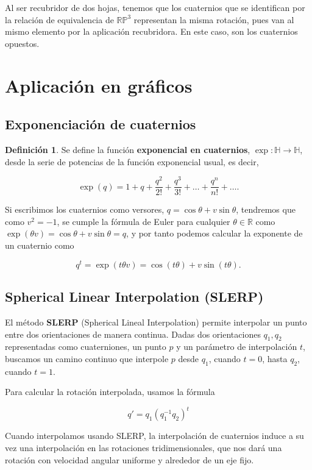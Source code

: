 \documentclass{article}
\theoremstyle{plain}
\theoremstyle{definition}
\newtheorem{definition}{Definición}
\theoremstyle{remark}
\begin{document}
Al ser recubridor de dos hojas, tenemos que los cuaternios que se
identifican por la relación de equivalencia de $\mathbb{RP}^3$
representan la misma rotación, pues van al mismo elemento por la
aplicación recubridora. En este caso, son los cuaternios opuestos.

\section{Aplicación en gráficos}

\subsection{Exponenciación de cuaternios}
\begin{definition}
  Se define la función \textbf{exponencial en cuaternios},
  $\exp \colon \mathbb{H} \to \mathbb{H}$, desde la serie de potencias
  de la función exponencial usual, es decir,

  \[
    \exp(q) =  1 + q + \frac{q^2}{2!} + \frac{q^3}{3!} + \dots + \frac{q^n}{n!} + \dots .
  \]
\end{definition}

Si escribimos los cuaternios como versores,
$q = \cos \theta + v \sin \theta$, tendremos que como $v^2 = -1$, se
cumple la fórmula de Euler para cualquier $\theta \in \mathbb{R}$ como
$\exp(\theta v) = \cos \theta + v \sin \theta = q$, y por tanto
podemos calcular la exponente de un cuaternio como

\[
  q^t = \exp(t \theta v) = \cos (t \theta) + v \sin (t \theta).
\]

\subsection{Spherical Linear Interpolation (SLERP)}
El método \textbf{SLERP} (Spherical Lineal Interpolation) permite
interpolar un punto entre dos orientaciones de manera continua. Dadas
dos orientaciones $q_1,q_2$ representadas como cuaterniones, un punto
$p$ y un parámetro de interpolación $t$, buscamos un camino continuo
que interpole $p$ desde $q_1$, cuando $t=0$, hasta $q_2$, cuando
$t=1$.

Para calcular la rotación interpolada, usamos la fórmula

\[q' = q_1(q_1^{-1}q_2)^t\]

Cuando interpolamos usando SLERP, la interpolación de cuaternios
induce a su vez una interpolación en las rotaciones tridimensionales,
que nos dará una rotación con velocidad angular uniforme y alrededor
de un eje fijo.
\end{document}
